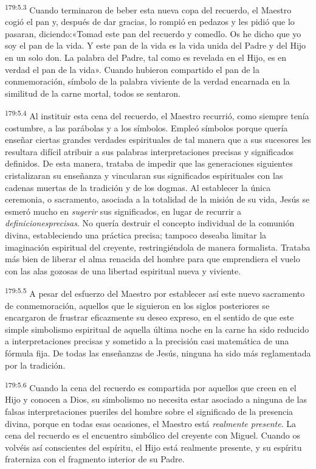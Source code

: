 \par 
\textsuperscript{179:5.3} Cuando terminaron de beber esta nueva copa del recuerdo, el Maestro cogió el pan y, después de dar gracias, lo rompió en pedazos y les pidió que lo pasaran, diciendo:«Tomad este pan del recuerdo y comedlo. Os he dicho que yo soy el pan de la vida. Y este pan de la vida es la vida unida del Padre y del Hijo en un solo don. La palabra del Padre, tal como es revelada en el Hijo, es en verdad el pan de la vida». Cuando hubieron compartido el pan de la conmemoración, símbolo de la palabra viviente de la verdad encarnada en la similitud de la carne mortal, todos se sentaron.

\par 
\textsuperscript{179:5.4} Al instituir esta cena del recuerdo, el Maestro recurrió, como siempre tenía costumbre, a las parábolas y a los símbolos. Empleó símbolos porque quería enseñar ciertas grandes verdades espirituales de tal manera que a sus sucesores les resultara difícil atribuir a sus palabras interpretaciones precisas y significados definidos. De esta manera, trataba de impedir que las generaciones siguientes cristalizaran su enseñanza y vincularan sus significados espirituales con las cadenas muertas de la tradición y de los dogmas. Al establecer la única ceremonia, o sacramento, asociada a la totalidad de la misión de su vida, Jesús se esmeró mucho en \textit{sugerir} sus significados, en lugar de recurrir a \textit{definicionesprecisas}. No quería destruir el concepto individual de la comunión divina, estableciendo una práctica precisa; tampoco deseaba limitar la imaginación espiritual del creyente, restringiéndola de manera formalista. Trataba más bien de liberar el alma renacida del hombre para que emprendiera el vuelo con las alas gozosas de una libertad espiritual nueva y viviente.

\par 
\textsuperscript{179:5.5} A pesar del esfuerzo del Maestro por establecer así este nuevo sacramento de conmemoración, aquellos que le siguieron en los siglos posteriores se encargaron de frustrar eficazmente su deseo expreso, en el sentido de que este simple simbolismo espiritual de aquella última noche en la carne ha sido reducido a interpretaciones precisas y sometido a la precisión casi matemática de una fórmula fija. De todas las enseñanzas de Jesús, ninguna ha sido más reglamentada por la tradición.

\par 
\textsuperscript{179:5.6} Cuando la cena del recuerdo es compartida por aquellos que creen en el Hijo y conocen a Dios, su simbolismo no necesita estar asociado a ninguna de las falsas interpretaciones pueriles del hombre sobre el significado de la presencia divina, porque en todas esas ocasiones, el Maestro está \textit{realmente presente}. La cena del recuerdo es el encuentro simbólico del creyente con Miguel. Cuando os volvéis así conscientes del espíritu, el Hijo está realmente presente, y su espíritu fraterniza con el fragmento interior de su Padre.

